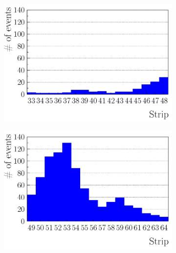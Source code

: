 \begin{figure}[!h]
\begin{subfigure}{0.5\linewidth}
				\begin{center}
					\includegraphics[width = 0.5\plotwidth]{fig/B1.pdf}
					\caption{\label{fig:HitProf:B1}}
				\end{center}
			\end{subfigure}
			\begin{subfigure}{0.5\linewidth}
				\begin{center}
					\includegraphics[width = 0.5\plotwidth]{fig/B2.pdf}\\
					\caption{\label{fig:HitProf:B2}}
				\end{center}
			\end{subfigure}
			\begin{subfigure}{0.5\linewidth}
				\begin{center}

\end{center}
\end{subfigure}
\end{figure}
